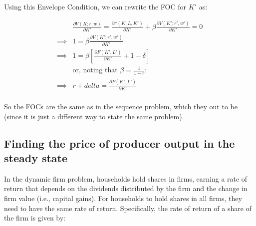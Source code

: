 \documentclass[letterpaper,12pt]{article}
\theoremstyle{definition}
\begin{document}
\begin{spacing}{1.5}
Using this Envelope Condition, we can rewrite the FOC for $K'$ as:

\begin{equation}
\label{eqn:bellman_foc_k2}
\begin{split}
&\frac{\partial V(K;r,w)}{\partial K'} = \frac{\partial \pi(K,L,K')}{\partial K'} + \beta \frac{\partial V(K'; r',w')}{\partial K'} = 0 \\
\implies & 1 = \beta \frac{\partial V(K';r',w')}{\partial K'}  \\
\implies & 1 = \beta \left[ \frac{\partial F(K',L')}{\partial K'} + 1 - \delta \right] \\
& \text{or, noting that } \beta = \frac{1}{1+r}: \\
\implies & r+delta = \frac{\partial F(K',L')}{\partial K'}  \\
\end{split}
\end{equation}

So the FOCs are the same as in the sequence problem, which they out to be (since it is just a different way to state the same problem).

%
%
%
%
%
%

\subsection*{Finding the price of producer output in the steady state}

In the dynamic firm problem, households hold shares in firms, earning a rate of return that depends on the dividends distributed by the firm and the change in firm value (i.e., capital gains).  For households to hold shares in all firms, they need to have the same rate of return.  Specifically, the rate of return of a share of the firm is given by:


\end{spacing}
\end{document}
